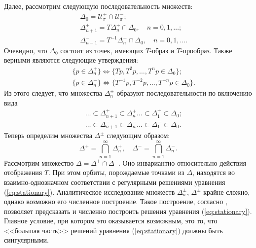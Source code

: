 Далее, рассмотрим следующую последовательность множеств:
%
\begin{eqnarray*}
&& \Delta_0 = \mathcal{U}_{\pi}^+ \cap \mathcal{U}_{\pi}^-; \\
&& \Delta_{n+1}^+ = T \Delta_n^+ \cap \Delta_0, \quad n = 0,1,\dots; \\
&& \Delta_{n-1}^- = T^{-1} \Delta_n^- \cap \Delta_0, \quad n = 0,1,\dots.
\end{eqnarray*}
%
Очевидно, что $\Delta_0$ состоит из точек, имеющих $T$-образ и $T$-прообраз.
Также верными являются следующие утверждения:
%
\begin{eqnarray*}
&& \{ p \in \Delta_n^+ \} \iff \{ Tp, T^2p, \dots, T^np \in \Delta_0 \}; \\
&& \{ p \in \Delta_n^- \} \iff \{ T^{-1}p, T^{-2}p, \dots, T^{-n}p \in \Delta_0 \}.
\end{eqnarray*}
%
Из этого следует, что множества $\Delta_n^{\pm}$ образуют последовательности по включению вида
%
\begin{eqnarray*}
&& \ldots \subset \Delta_{n+1}^+ \subset \Delta_n^+ \ldots \subset \Delta_1^+ \subset \Delta_0; \\
&& \ldots \subset \Delta_{n+1}^- \subset \Delta_n^- \ldots \subset \Delta_1^- \subset \Delta_0.
\end{eqnarray*}
%
Теперь определим множества $\Delta^{\pm}$ следующим образом:
%
\begin{equation*}
\Delta^+ = \bigcap \limits_{n=1}^{\infty} \Delta_n^+, \quad \Delta^- = \bigcap_{n=1}^{\infty} \Delta_n^-.
\end{equation*}
%
Рассмотрим множество $\Delta = \Delta^+ \cap \Delta^-$.
Оно инвариантно относительно действия отображения $T$.
При этом орбиты, порождаемые точками из $\Delta$, находятся во взаимно-однозначном соответствии с регулярными решениями уравнения (\ref{eq:stationary}).
Аналитическое исследование множеств $\Delta_n^{\pm}$, $\Delta^{\pm}$ крайне сложно, однако возможно его численное построение.
Такое построение, согласно \cite{AlfAvr}, позволяет предсказать и численно построить решения уравнения (\ref{eq:stationary}).
Главное условие, при котором это оказывается возможным, это то, что <<большая часть>> решений уравнения (\ref{eq:stationary}) должны быть сингулярными.

